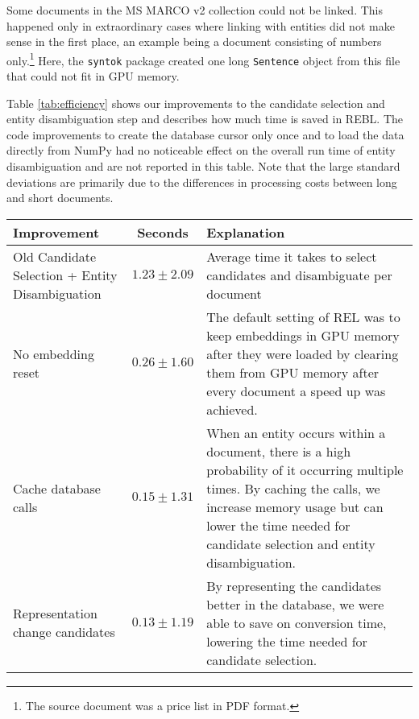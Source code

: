 Some documents in the MS MARCO v2 collection could not be linked. This happened only in extraordinary cases where linking with entities did not make sense in the first place, an example being a document consisting of numbers only.\footnote{The source document was a price list in PDF format.} Here, the \texttt{syntok} package created one long \texttt{Sentence} object from this file that could not fit in GPU memory.

Table \ref{tab:efficiency} shows our improvements to the candidate selection and entity disambiguation step and describes how much time is saved in REBL. The code improvements to create the database cursor only once and to load the data directly from NumPy had no noticeable effect on the overall run time of entity disambiguation and are not reported in this table. Note that the large standard deviations are primarily due to the differences in processing costs between long and short documents.

\begin{sidewaystable}
	\caption{Efficiency improvements for Candidate Selection and Entity Disambiguation. Improvements are calculated over a sample of 5000 documents using a machine with an Intel Xeon Silver 4214 CPU @ 2.20GHz using two cores with 187GB RAM and a GeForce RTX 2080 Ti (11GB) GPU. Improvements are cumulative; the times shown include the previous improvement as well.}
	\label{tab:efficiency}
	\begin{tabular}{p{6cm} c p{10cm}}
		\toprule
		Improvement & Seconds & Explanation\\
		\midrule
		Old Candidate Selection + Entity Disambiguation & $1.23 \pm 2.09$ & Average time it takes to select candidates and disambiguate per document\\
		\midrule
		No embedding reset & $0.26 \pm 1.60$ & The default setting of REL was to keep embeddings in GPU memory after they were loaded by clearing them from GPU memory after every document a speed up was achieved.\\
		Cache database calls & $0.15 \pm 1.31$ & When an entity occurs within a document, there is a high probability of it occurring multiple times. By caching the calls, we increase memory usage but can lower the time needed for candidate selection and entity disambiguation.  \\
		Representation change candidates & $0.13 \pm 1.19$ & By representing the candidates better in the database, we were able to save on conversion time, lowering the time needed for candidate selection.\\
		\bottomrule
	\end{tabular}
\end{sidewaystable}


